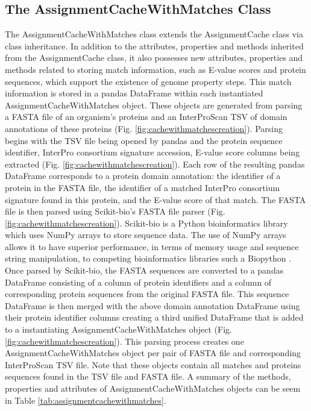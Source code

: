\subsection{The AssignmentCacheWithMatches Class}

The AssignmentCacheWithMatches class extends the AssignmentCache class via class inheritance. In addition to the attributes, properties and methods inherited from the AssignmentCache class, it also possesses new attributes, properties and methods related to storing match information, such as E-value scores and protein sequences, which support the existence of genome property steps. This match information is stored in a pandas DataFrame within each instantiated AssignmentCacheWithMatches object. These objects are generated from parsing a FASTA file \cite{pearson19905} of an organism's proteins and an InterProScan TSV of domain annotations of these proteins (Fig. \ref{fig:cachewithmatchescreation}). Parsing begins with the TSV file being opened by pandas and the protein sequence identifier, InterPro consortium signature accession, E-value score columns being extracted (Fig. \ref{fig:cachewithmatchescreation}). Each row of the resulting pandas DataFrame corresponds to a protein domain annotation: the identifier of a protein in the FASTA file, the identifier of a matched InterPro consortium signature found in this protein, and the E-value score of that match. The FASTA file is then parsed using Scikit-bio's FASTA file parser (Fig. \ref{fig:cachewithmatchescreation})\cite{scikitbio}. Scikit-bio is a Python bioinformatics library which uses NumPy arrays to store sequence data. The use of NumPy arrays allows it to have superior performance, in terms of memory usage and sequence string manipulation, to competing bioinformatics libraries such a Biopython \cite{cock2009biopython}. Once parsed by Scikit-bio, the FASTA sequences are converted to a pandas DataFrame consisting of a column of protein identifiers and a column of corresponding protein sequences from the original FASTA file. This sequence DataFrame is then merged with the above domain annotation DataFrame using their protein identifier columns creating a third unified DataFrame that is added to a instantiating AssignmentCacheWithMatches object (Fig. \ref{fig:cachewithmatchescreation}). This parsing process creates one AssignmentCacheWithMatches object per pair of FASTA file and corresponding InterProScan TSV file. Note that these objects contain all matches and proteins sequences found in the TSV file and FASTA file. A summary of the methods, properties and attributes of AssignmentCacheWithMatches objects can be seem in Table \ref{tab:assignmentcachewithmatches}. 

